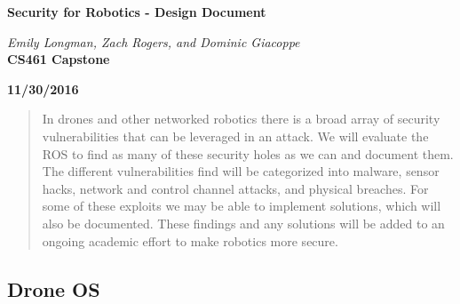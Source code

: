 \documentclass[IEEEtran,letterpaper,10pt,titlepage,draftclsnofoot,onecolumn]{article}
\begin{document}
\begin{titlepage}
  \begin{center}
    \vspace*{1cm}
    
    \huge
    \textbf{Security for Robotics - Design Document}      
  \vspace{0.5cm}
        
    \textit{Emily Longman, Zach Rogers, and Dominic Giacoppe}\\ 
  \vspace{0.5cm}
    \vfill
    \large
    \textbf{CS461 Capstone}\\ 
  \vspace{5mm}

    \textbf{11/30/2016}\\ 
    
    \vfill
    \end{center}
\end{titlepage}

\begin{abstract}
  In drones and other networked robotics there is a broad array of security vulnerabilities that can be leveraged in an attack. 
  We will evaluate the ROS to find as many of these security holes as we can and document them. 
  The different vulnerabilities find will be categorized into malware, sensor hacks, network and control channel attacks, and physical breaches. 
  For some of these exploits we may be able to implement solutions, which will also be documented. 
  These findings and any solutions will be added to an ongoing academic effort to make robotics more secure.
\end{abstract}

\subsection*{Drone OS}
\end{document}

